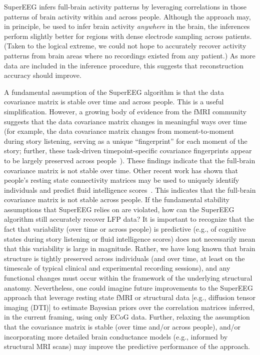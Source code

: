 
SuperEEG infers full-brain activity patterns by leveraging
correlations in those patterns of brain activity within and across people.  Although
the approach may, in principle, be used to infer brain activity
\textit{anywhere} in the brain, the inferences perform slightly better for
regions with dense electrode sampling across patients.  (Taken to the logical extreme, we could not hope to accurately recover activity patterns from brain areas where no recordings existed from any patient.)   As more data
are included in the inference procedure, this suggests that reconstruction accuracy should improve.

A fundamental assumption of the SuperEEG algorithm is that the data
covariance matrix is stable over time and across people.  This is a
useful simplification.  However, a growing body of evidence from the
fMRI community suggests that the data covariance matrix changes in
meaningful ways over time (for example, the data covariance matrix
changes from moment-to-moment during story listening, serving as a
unique ``fingerprint'' for each moment of the story; further, these
task-driven timepoint-specific covariance fingerprints appear to be
largely preserved across people~\cite{SimoEtal16, MannEtal18}).  These
findings indicate that the full-brain covariance matrix is not stable
over time.  Other recent work has shown that people's resting state
connectivity matrices may be used to uniquely identify individuals and
predict fluid intelligence scores~\cite{FinnEtal15}.  This indicates
that the full-brain covariance matrix is not stable across people.  If
the fundamental stability assumptions that SuperEEG relies on are
violated, how can the SuperEEG algorithm still accurately recover LFP
data?  It is important to recognize that the fact that variability
(over time or across people) is predictive (e.g., of cognitive states
during story listening or fluid intelligence scores) does not
necessarily mean that this variability is large in magnitude.  Rather,
we have long known that brain structure is tightly preserved across
individuals (and over time, at least on the timescale of typical
clinical and experimental recording sessions), and any functional
changes must occur within the framework of the underlying structural
anatomy.  Nevertheless, one could imagine future improvements to the
SuperEEG approach that leverage resting state fMRI or structural data
[e.g., diffusion tensor imaging (DTI)] to estimate Bayesian priors over
the correlation matrices inferred, in the current framing, using only
ECoG data.  Further, relaxing the assumption that the covariance
matrix is stable (over time and/or across people), and/or
incorporating more detailed brain conductance models (e.g., informed
by structural MRI scans) may improve the predictive performance of the
approach.



